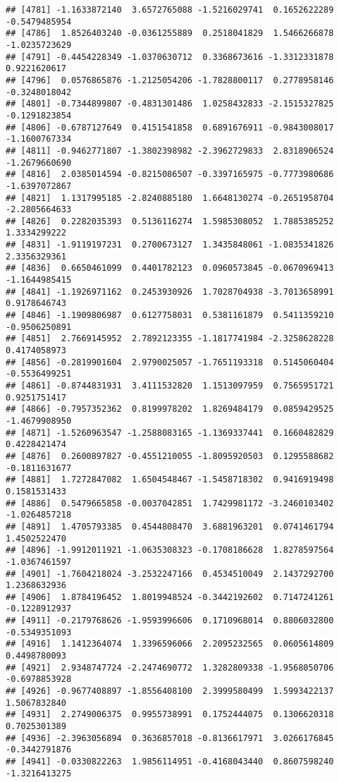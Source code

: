 \documentclass[
]{article}
\begin{document}
\begin{verbatim}
## [4781] -1.1633872140  3.6572765088 -1.5216029741  0.1652622289 -0.5479485954
## [4786]  1.8526403240 -0.0361255889  0.2518041829  1.5466266878 -1.0235723629
## [4791] -0.4454228349 -1.0370630712  0.3368673616 -1.3312331878  0.9221620617
## [4796]  0.0576865876 -1.2125054206 -1.7828800117  0.2778958146 -0.3248018042
## [4801] -0.7344899807 -0.4831301486  1.0258432833 -2.1515327825 -0.1291823854
## [4806] -0.6787127649  0.4151541858  0.6891676911 -0.9843008017 -1.1600767334
## [4811] -0.9462771807 -1.3802398982 -2.3962729833  2.8318906524 -1.2679660690
## [4816]  2.0385014594 -0.8215086507 -0.3397165975 -0.7773980686 -1.6397072867
## [4821]  1.1317995185 -2.8240885180  1.6648130274 -0.2651958704 -2.2805664633
## [4826]  0.2282035393  0.5136116274  1.5985308052  1.7885385252  1.3334299222
## [4831] -1.9119197231  0.2700673127  1.3435848061 -1.0835341826  2.3356329361
## [4836]  0.6650461099  0.4401782123  0.0960573845 -0.0670969413 -1.1644985415
## [4841] -1.1926971162  0.2453930926  1.7028704938 -3.7013658991  0.9178646743
## [4846] -1.1909806987  0.6127758031  0.5381161879  0.5411359210 -0.9506250891
## [4851]  2.7669145952  2.7892123355 -1.1817741984 -2.3258628228  0.4174058973
## [4856] -0.2819901604  2.9790025057 -1.7651193318  0.5145060404 -0.5536499251
## [4861] -0.8744831931  3.4111532820  1.1513097959  0.7565951721  0.9251751417
## [4866] -0.7957352362  0.8199978202  1.8269484179  0.0859429525 -1.4679908950
## [4871] -1.5260963547 -1.2588083165 -1.1369337441  0.1660482829  0.4228421474
## [4876]  0.2600897827 -0.4551210055 -1.8095920503  0.1295588682 -0.1811631677
## [4881]  1.7272847082  1.6504548467 -1.5458718302  0.9416919498  0.1581531433
## [4886]  0.5479665858 -0.0037042851  1.7429981172 -3.2460103402 -1.0264857218
## [4891]  1.4705793385  0.4544808470  3.6881963201  0.0741461794  1.4502522470
## [4896] -1.9912011921 -1.0635308323 -0.1708186628  1.8278597564 -1.0367461597
## [4901] -1.7604218024 -3.2532247166  0.4534510049  2.1437292700  1.2368632936
## [4906]  1.8784196452  1.8019948524 -0.3442192602  0.7147241261 -0.1228912937
## [4911] -0.2179768626 -1.9593996606  0.1710968014  0.8806032800 -0.5349351093
## [4916]  1.1412364074  1.3396596066  2.2095232565  0.0605614809  0.4498780093
## [4921]  2.9348747724 -2.2474690772  1.3282809338 -1.9568050706 -0.6978853928
## [4926] -0.9677408897 -1.8556408100  2.3999580499  1.5993422137  1.5067832840
## [4931]  2.2749006375  0.9955738991  0.1752444075  0.1306620318  0.7025301389
## [4936] -2.3963056894  0.3636857018 -0.8136617971  3.0266176845 -0.3442791876
## [4941] -0.0330822263  1.9856114951 -0.4168043440  0.8607598240 -1.3216413275

\end{verbatim}
\end{document}
